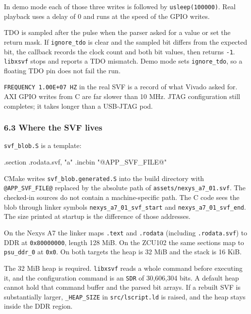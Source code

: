 \documentclass[
  11pt,
  a4paper,
]{article}
\newenvironment{Shaded}{}{}
\newcommand{\BuiltInTok}[1]{\textcolor[rgb]{0.00,0.50,0.00}{#1}}
\newcommand{\NormalTok}[1]{#1}
\newcommand{\OperatorTok}[1]{\textcolor[rgb]{0.40,0.40,0.40}{#1}}
\newcommand{\StringTok}[1]{\textcolor[rgb]{0.25,0.44,0.63}{#1}}
\begin{document}
In demo mode each of those three writes is followed by
\texttt{usleep(100000)}. Real playback uses a delay of 0 and runs at the
speed of the GPIO writes.

TDO is sampled after the pulse when the parser asked for a value or set
the return mask. If \texttt{ignore\_tdo} is clear and the sampled bit
differs from the expected bit, the callback records the clock count and
both bit values, then returns \texttt{-1}. \texttt{libxsvf} stops and
reports a TDO mismatch. Demo mode sets \texttt{ignore\_tdo}, so a
floating TDO pin does not fail the run.

\texttt{FREQUENCY\ 1.00E+07\ HZ} in the real SVF is a record of what
Vivado asked for. AXI GPIO writes from C are far slower than 10 MHz.
JTAG configuration still completes; it takes longer than a USB-JTAG pod.

\subsubsection{6.3 Where the SVF lives}\label{where-the-svf-lives}

\texttt{svf\_blob.S} is a template:

\begin{Shaded}
\begin{Highlighting}[]
\NormalTok{.}\BuiltInTok{section} \OperatorTok{.}\NormalTok{rodata}\OperatorTok{.}\NormalTok{svf}\OperatorTok{,} \StringTok{"a"}
\NormalTok{.incbin }\StringTok{"@APP\_SVF\_FILE@"}
\end{Highlighting}
\end{Shaded}

CMake writes \texttt{svf\_blob.generated.S} into the build directory
with \texttt{@APP\_SVF\_FILE@} replaced by the absolute path of
\texttt{assets/nexys\_a7\_01.svf}. The checked-in sources do not contain
a machine-specific path. The C code sees the blob through linker symbols
\texttt{nexys\_a7\_01\_svf\_start} and \texttt{nexys\_a7\_01\_svf\_end}.
The size printed at startup is the difference of those addresses.

On the Nexys A7 the linker maps \texttt{.text} and \texttt{.rodata}
(including \texttt{.rodata.svf}) to DDR at \texttt{0x80000000}, length
128 MiB. On the ZCU102 the same sections map to \texttt{psu\_ddr\_0} at
\texttt{0x0}. On both targets the heap is 32 MiB and the stack is 16
KiB.

The 32 MiB heap is required. \texttt{libxsvf} reads a whole command
before executing it, and the configuration command is an \texttt{SDR} of
30,606,304 bits. A default heap cannot hold that command buffer and the
parsed bit arrays. If a rebuilt SVF is substantially larger,
\texttt{\_HEAP\_SIZE} in \texttt{src/lscript.ld} is raised, and the heap
stays inside the DDR region.
\end{document}
